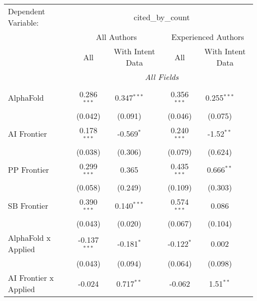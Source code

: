 \begingroup
\centering
\begin{tabular}{lcccccc}
   \tabularnewline \midrule \midrule
   Dependent Variable: & \multicolumn{6}{c}{cited\_by\_count}\\
 & \multicolumn{3}{c}{All Authors} & \multicolumn{3}{c}{Experienced Authors} \\
\cmidrule(lr){2-4} \cmidrule(lr){5-7}
 & \multicolumn{1}{c}{All} & \multicolumn{2}{c}{With Intent Data} & \multicolumn{1}{c}{All} & \multicolumn{2}{c}{With Intent Data} \\
\cmidrule(lr){2-2} \cmidrule(lr){3-4} \cmidrule(lr){5-5} \cmidrule(lr){6-7}
 & \multicolumn{6}{c}{\textit{All Fields}} \\ \\
   AlphaFold                      & 0.286$^{***}$  & 0.347$^{***}$ &                & 0.356$^{***}$  & 0.255$^{***}$ &   \\   
                                  & (0.042)        & (0.091)       &                & (0.046)        & (0.075)       &   \\   
   AI Frontier                    & 0.178$^{***}$  & -0.569$^{*}$  &                & 0.240$^{***}$  & -1.52$^{**}$  &   \\   
                                  & (0.038)        & (0.306)       &                & (0.079)        & (0.624)       &   \\   
   PP Frontier                    & 0.299$^{***}$  & 0.365         &                & 0.435$^{***}$  & 0.666$^{**}$  &   \\   
                                  & (0.058)        & (0.249)       &                & (0.109)        & (0.303)       &   \\   
   SB Frontier                    & 0.390$^{***}$  & 0.140$^{***}$ &                & 0.574$^{***}$  & 0.086         &   \\   
                                  & (0.043)        & (0.020)       &                & (0.067)        & (0.104)       &   \\   
   AlphaFold x Applied            & -0.137$^{***}$ & -0.181$^{*}$  &                & -0.122$^{*}$   & 0.002         &   \\   
                                  & (0.043)        & (0.094)       &                & (0.064)        & (0.098)       &   \\   
   AI Frontier x Applied          & -0.024         & 0.717$^{**}$  &                & -0.062         & 1.51$^{**}$   &   \\   

\end{tabular}
